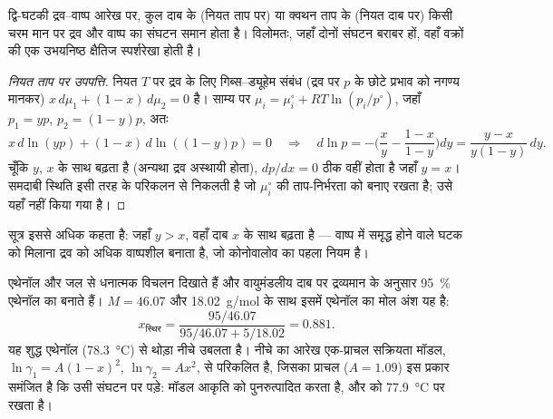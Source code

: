 \begin{theorem}[गिब्स--कोनोवालोव]\label{thm:b2:liquid-vapour-diagrams:konovalov}
द्वि-घटकी द्रव--वाष्प आरेख पर, कुल दाब के (नियत
ताप पर) या क्वथन ताप के (नियत दाब पर) किसी चरम मान पर
द्रव और वाष्प का संघटन समान होता है। विलोमतः, जहाँ
दोनों संघटन बराबर हों, वहाँ वक्रों की एक उभयनिष्ठ क्षैतिज स्पर्शरेखा होती है।
\end{theorem}

\begin{proof}[नियत ताप पर उपपत्ति]
नियत $T$ पर द्रव के लिए गिब्स--ड्यूहेम संबंध (द्रव पर $p$ के छोटे प्रभाव को
नगण्य मानकर) $x\,d\mu_1 + (1 - x)\,d\mu_2 = 0$ है। साम्य पर
$\mu_i = \mu_i^\circ + RT\ln(p_i/p^\circ)$, जहाँ $p_1 = yp$, $p_2 = (1 - y)p$, अतः
\[
  x\,d\ln(yp) + (1 - x)\,d\ln((1 - y)p) = 0
  \quad\Longrightarrow\quad
  d\ln p = -\Big(\frac{x}{y} - \frac{1 - x}{1 - y}\Big)dy
  = \frac{y - x}{y(1 - y)}\,dy .
\]
चूँकि $y$, $x$ के साथ बढ़ता है (अन्यथा द्रव अस्थायी होता),
$dp/dx = 0$ ठीक वहीं होता है जहाँ $y = x$। समदाबी स्थिति इसी तरह के
परिकलन से निकलती है जो $\mu_i^\circ$ की ताप-निर्भरता को बनाए रखता है; उसे
यहाँ नहीं किया गया है।
\end{proof}

सूत्र इससे अधिक कहता है: जहाँ $y > x$, वहाँ दाब $x$ के साथ बढ़ता है ---
वाष्प में समृद्ध होने वाले घटक को मिलाना द्रव को अधिक
वाष्पशील बनाता है, जो कोनोवालोव का पहला नियम है।

\begin{example}[एथेनॉल और जल]\label{ex:b2:liquid-vapour-diagrams:ethanol-water}
एथेनॉल और जल  से धनात्मक विचलन दिखाते हैं और वायुमंडलीय दाब पर
द्रव्यमान के अनुसार 95~\% एथेनॉल का  बनाते हैं। $M = 46.07$ और
\qty{18.02}{g/mol} के साथ इसमें एथेनॉल का मोल अंश यह है:
\[
  x_{\text{स्थिर}} = \frac{95/46.07}{95/46.07 + 5/18.02} = 0.881 .
\]
यह शुद्ध एथेनॉल (\qty{78.3}{\degreeCelsius}) से थोड़ा नीचे उबलता है। नीचे का आरेख
एक-प्राचल सक्रियता मॉडल, $\ln\gamma_1 = A(1 -
x)^2$, $\ln\gamma_2 = Ax^2$, से परिकलित है, जिसका प्राचल ($A = 1.09$) इस प्रकार समंजित है कि
 उसी संघटन पर पड़े: मॉडल आकृति को पुनरुत्पादित करता है, और
 को \qty{77.9}{\degreeCelsius} पर रखता है।
\end{example}

